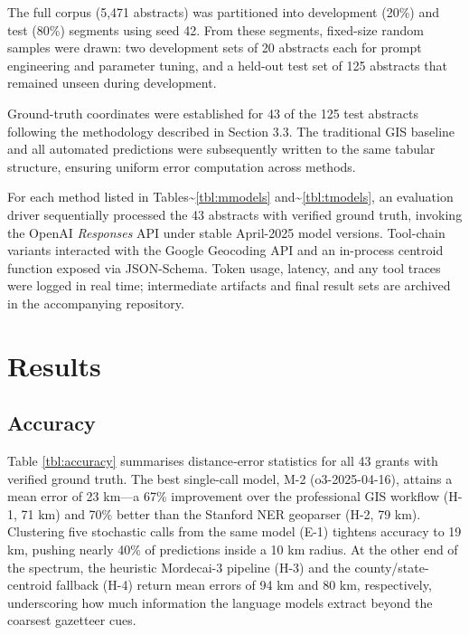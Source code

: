 The full corpus (5,471 abstracts) was partitioned into development
(20\%) and test (80\%) segments using seed 42. From these segments,
fixed-size random samples were drawn: two development sets of 20
abstracts each for prompt engineering and parameter tuning, and a
held-out test set of 125 abstracts that remained unseen during
development.

Ground-truth coordinates were established for 43 of the 125 test
abstracts following the methodology described in Section 3.3. The
traditional GIS baseline and all automated predictions were subsequently
written to the same tabular structure, ensuring uniform error
computation across methods.

For each method listed in Tables\textasciitilde{}\ref{tbl:mmodels}
and\textasciitilde{}\ref{tbl:tmodels}, an evaluation driver sequentially
processed the 43 abstracts with verified ground truth, invoking the
OpenAI \emph{Responses} API under stable April-2025 model versions.
Tool-chain variants interacted with the Google Geocoding API and an
in-process centroid function exposed via JSON-Schema. Token usage,
latency, and any tool traces were logged in real time; intermediate
artifacts and final result sets are archived in the accompanying
repository.

\section{Results}\label{results}

\subsection{Accuracy}\label{accuracy}

Table \ref{tbl:accuracy} summarises distance‐error statistics for all 43
grants with verified ground truth. The best single-call model, M-2
(o3-2025-04-16), attains a mean error of 23 km---a 67\% improvement over
the professional GIS workflow (H-1, 71 km) and 70\% better than the
Stanford NER geoparser (H-2, 79 km). Clustering five stochastic calls
from the same model (E-1) tightens accuracy to 19 km, pushing nearly
40\% of predictions inside a 10 km radius. At the other end of the
spectrum, the heuristic Mordecai-3 pipeline (H-3) and the
county/state-centroid fallback (H-4) return mean errors of 94 km and 80
km, respectively, underscoring how much information the language models
extract beyond the coarsest gazetteer cues.

